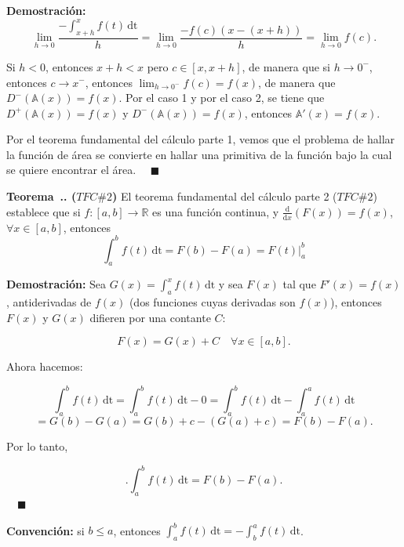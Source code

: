 \documentclass{article}
\numberwithin{equation}{section}
\newcommand{\Col}{\color{ProcessBlue}}
\newcommand{\derivate}[2]{\frac{\mathrm{d}}{\mathrm{d}#1} \left(  {#2}  \right)  }
\newcounter{theorem}[section]
\newenvironment
{theorem}[1][]
{\vspace{0.5cm}\refstepcounter{theorem}\par\medskip\noindent\textbf{\Col Teorema~\thesection.\thetheorem. #1}\rmfamily}
{}
\newenvironment
{proof}
{\par\medskip\noindent\textbf{Demostración:}\rmfamily}
{\Col\hfill$\quad \blacksquare$\vspace{0.5cm}}
\begin{document}
\begin{proof}
    $$\lim_{h\to 0} \frac{-\int_{x+h}^{x} \! {f(t)} \, \mathrm{dt}}{h}=\lim_{h\to 0}\frac{-f(c)(x-(x+h))}{h}=\lim_{h\to 0}f(c).$$

    Si $h<0$, entonces $x+h<x$ pero $c\in [x,x+h]$, de manera que si $h\longrightarrow 0^-$, entonces $c\longrightarrow x^-$, entonces $\lim_{h\to 0^-}f(c)=f(x)$, de manera que $D^-(\mathbb{A}(x))=f(x).$
    \vspace{0.3cm}
    Por el caso 1 y por el caso 2, se tiene que $D^+(\mathbb{A}(x))=f(x)$ y $D^-(\mathbb{A}(x))=f(x)$, entonces $\mathbb{A}'(x)=f(x)$.
    \vspace{0.3cm}
    \par Por el teorema fundamental del cálculo parte 1, vemos que el problema de hallar la función de área se convierte en hallar una primitiva de la función bajo la cual se quiere encontrar el área. 
\end{proof}

\begin{theorem}[($TFC \#2$)]
    El teorema fundamental del cálculo parte 2 ($TFC \#2$) establece que si $f:[a,b]\longrightarrow\mathbb{R}$ es una función continua, y $\derivate{x}{F(x)}=f(x)$, $\forall x\in [a,b]$, entonces 
    $$ \int_{a}^{b} \! {f(t)} \, \mathrm{dt}=F(b)-F(a)=F(t) \Big|_a^b $$ 
\end{theorem}

\begin{proof}
    Sea $G(x)=\int_{a}^{x} \! {f(t)} \, \mathrm{dt}$ y sea $F(x)$ tal que $F'(x)=f(x)$, antiderivadas de $f(x)$ (dos funciones cuyas derivadas son $f(x)$), entonces $F(x)$ y $G(x)$ difieren por una contante $C$:

    $$ F(x)=G(x)+C \quad \forall x\in [a,b].$$

    Ahora hacemos:

    $$\int_{a}^{b} \! {f(t)} \, \mathrm{dt}=\int_{a}^{b} \! {f(t)} \, \mathrm{dt}-0=\int_{a}^{b} \! {f(t)} \, \mathrm{dt}- \int_{a}^{a} \! {f(t)} \, \mathrm{dt}$$
    $$=G(b)-G(a)=G(b)+c-(G(a)+c)=F(b)-F(a).$$

    Por lo tanto, 

    $$.\int_{a}^{b} \! {f(t)} \, \mathrm{dt}=F(b)-F(a).$$
\end{proof}

\textbf{Convención:} si $b\leq a$, entonces $\int_{a}^{b} \! {f(t)} \, \mathrm{dt}=-\int_{b}^{a} \! {f(t)} \, \mathrm{dt}$.

\newpage

\vspace{1cm}
\end{document}
